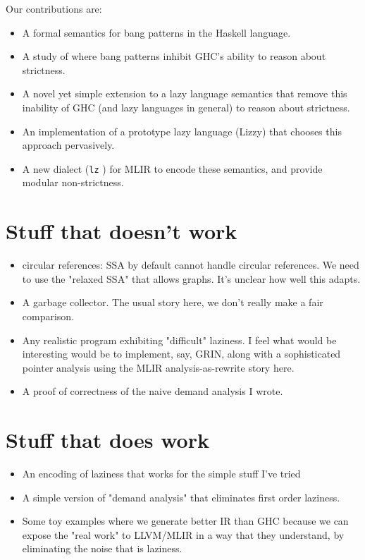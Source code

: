 \documentclass[sigplan,\review anonymous]{acmart}
\newcommand{\lz}{\texttt{lz} }
\begin{document}
Our contributions are:                                          
\begin{itemize}
\item A formal semantics for bang patterns in the Haskell language.
\item A study of where bang patterns inhibit GHC's ability to reason about strictness.
\item A novel yet simple extension to a lazy language semantics that remove this
      inability of GHC (and lazy languages in general) to reason about strictness.
\item An implementation of a prototype lazy language (Lizzy) that chooses this
      approach pervasively.
\item A new dialect (\lz) for MLIR to encode these semantics, and provide modular
      non-strictness.
\end{itemize}

\section{Stuff that doesn't work}
\begin{itemize}
\item circular references: SSA by default cannot handle circular references.
      We need to use the "relaxed SSA" that allows graphs. It's unclear how well
      this adapts.
\item A garbage collector. The usual story here, we don't really make a fair
      comparison.
\item Any realistic program exhibiting "difficult" laziness. I feel what would
      be interesting would be to implement, say, GRIN, along with a sophisticated
      pointer analysis using the MLIR analysis-as-rewrite story here.
\item A proof of correctness of the naive demand analysis I wrote.
\end{itemize}


\section{Stuff that does work}
\begin{itemize}
\item An encoding of laziness that works for the simple stuff I've tried
\item A simple version of "demand analysis" that eliminates first order laziness.
\item Some toy examples where we generate better IR than GHC because we can
     expose the "real work" to LLVM/MLIR in a way that they understand, by
     eliminating the noise that is laziness.
\end{itemize}
\end{document}

